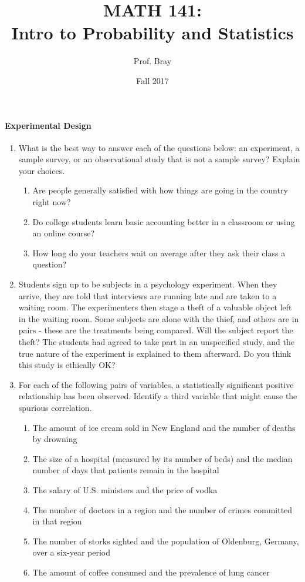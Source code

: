 \documentclass[10pt]{article}\usepackage[]{graphicx}\usepackage[]{color}
\title{MATH 141:\\Intro to Probability and Statistics}
\author{Prof. Bray}
\date{Fall 2017}
\newcommand{\ans}{\vspace{0.25in}}
\begin{document}

\paragraph{Experimental Design}

\begin{enumerate}
  \item What is the best way to answer each of the questions below: an experiment, a sample survey, or an observational study that is not a sample survey? Explain your choices.
  \begin{enumerate}
    \itemsep0.25in
    \item Are people generally satisfied with how things are going in the country right now?
    \item Do college students learn basic accounting better in a classroom or using an online course?
    \item How long do your teachers wait on average after they ask their class a question?
    \ans
  \end{enumerate}
  
  \item Students sign up to be subjects in a psychology experiment. When they arrive, they are told that interviews are running late and are taken to a waiting room. The experimenters then stage a theft of a valuable object left in the waiting room. Some subjects are alone with the thief, and others are in pairs - these are the treatments being compared. Will the subject report the theft? The students had agreed to take part in an unspecified study, and the true nature of the experiment is explained to them afterward. Do you think this study is ethically OK?

\ans
\ans

\item For each of the following pairs of variables, a statistically significant positive relationship has been observed. Identify a third variable that might cause the spurious correlation.
\begin{enumerate}
  \itemsep0.5in
  \item The amount of ice cream sold in New England and the number of deaths by drowning
  \item The size of a hospital (measured by its number of beds) and the median number of days that patients remain in the hospital
  \item The salary of U.S. ministers and the price of vodka
  \item The number of doctors in a region and the number of crimes committed in that region
  \item The number of storks sighted and the population of Oldenburg, Germany, over a six-year period
  \item The amount of coffee consumed and the prevalence of lung cancer
\end{enumerate}
\end{enumerate}
\end{document}
